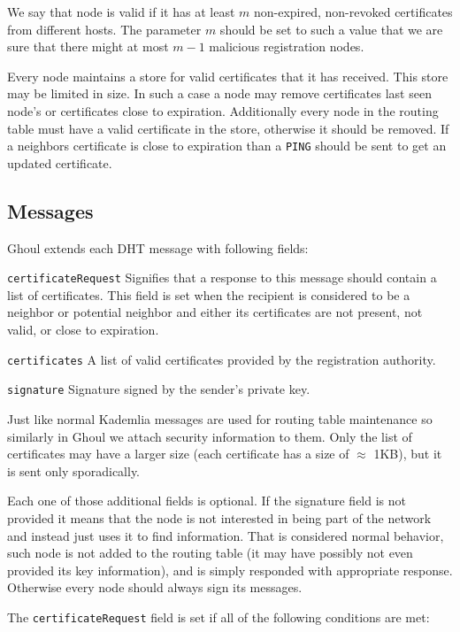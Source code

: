 We say that node is valid if it has at least $m$ non-expired, non-revoked
certificates from different hosts. The parameter $m$ should be set to such a
value that we are sure that there might at most $m-1$ malicious registration
nodes.

Every node maintains a store for valid certificates that it has received. This
store may be limited in size. In such a case a node may remove certificates last
seen node's or certificates close to expiration. Additionally every node in the
routing table must have a valid certificate in the store, otherwise it should be
removed. If a neighbors certificate is close to expiration than a \texttt{PING}
should be sent to get an updated certificate.

\subsection{Messages}
Ghoul extends each DHT message with following fields:
\begin{description}
  \item{\texttt{certificateRequest}} Signifies that a response to this message
    should contain a list of certificates. This field is set when the recipient
    is considered to be a neighbor or potential neighbor and either its
    certificates are not present, not valid, or close to expiration.
  \item{\texttt{certificates}} A list of valid certificates provided by the
    registration authority.
  \item{\texttt{signature}} Signature signed by the sender's private key.
\end{description}

Just like normal Kademlia messages are used for routing table maintenance so
similarly in Ghoul we attach security information to them. Only the list of
certificates may have a larger size (each certificate has a size of $\approx$
1KB), but it is sent only sporadically.

Each one of those additional fields is optional. If the signature field is not
provided it means that the node is not interested in being part of the network
and instead just uses it to find information. That is considered normal
behavior, such node is not added to the routing table (it may have possibly not
even provided its key information), and is simply responded with appropriate
response. Otherwise every node should always sign its messages.

The \texttt{certificateRequest} field is set if all of the following conditions
are met:

